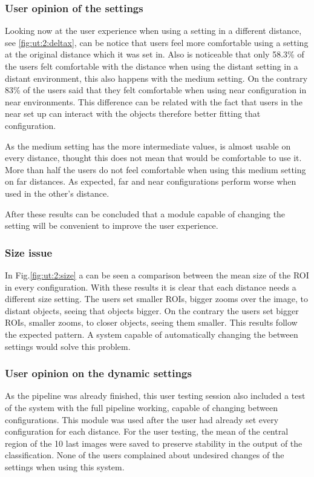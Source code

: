 \documentclass[10pt,a4paper,twocolumn,twoside]{article}
\begin{document}
	\subsubsection{User opinion of the settings }
	Looking now at the user experience when using a setting in a different distance, see \ref{fig:ut:2:deltax}, can be notice that users feel more comfortable using a setting at the original distance which it was set in. Also is noticeable that only 58.3\% of the users felt comfortable with the distance when using the distant setting in a distant environment, this also happens with the medium setting. On the contrary 83\% of the users said that they felt comfortable when using near configuration in near environments. This difference can be related with the fact that users in the near set up can interact with the objects therefore better fitting that configuration. 
	
	As the medium setting has the more intermediate values, is almost usable on every distance, thought this does not mean that would be comfortable to use it. More than half the users do not feel comfortable when using this medium setting on far distances. As expected, far and near configurations perform worse when used in the other's distance.
	
	After these results can be concluded that a module capable of changing the setting will be convenient to improve the user experience. 
	
	\subsubsection{Size issue}
	
	In Fig.\ref{fig:ut:2:size} a can be seen a comparison between the mean size of the ROI in every configuration. With these results it is clear that each distance needs a different size setting.  The users set smaller ROIs, bigger zooms over the image, to distant objects, seeing that objects bigger. On the contrary the users set bigger ROIs, smaller zooms, to closer objects, seeing them smaller. This results follow the expected pattern. A system capable of automatically changing the between settings would solve this problem. 
	
	\subsubsection{User opinion on the dynamic settings}
	As the pipeline was already finished, this user testing session also included a test of the system with the full pipeline working, capable of changing between configurations. This module was used after the user had already set every configuration for each distance.  
	For the user testing, the mean of the central region of the 10 last images were saved to preserve stability in the output of the classification. None of the users complained about undesired changes of the settings when using this system.  
	
\end{document}
